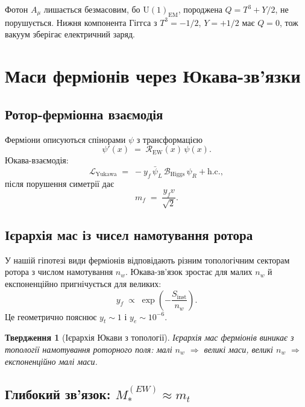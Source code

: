 \documentclass[11pt,a4paper]{article}
\newcommand{\Rotor}{\mathcal{R}}
\newcommand{\Biv}{\mathcal{B}}
\newcommand{\UU}{\mathrm{U}}
\newcommand{\Lag}{\mathcal{L}}
\theoremstyle{definition}
\theoremstyle{plain}
\newtheorem{proposition}{Твердження}
\theoremstyle{remark}
\begin{document}
Фотон $A_\mu$ лишається безмасовим, бо $\UU(1)_{\text{EM}}$, породжена $Q=T^3+Y/2$, не порушується. Нижня компонента Гіггса з $T^3=-1/2$, $Y=+1/2$ має $Q=0$, тож вакуум зберігає електричний заряд.

\vspace{1em}

\section{Маси ферміонів через Юкава-зв’язки}\label{sec:fermion-masses}

\subsection{Ротор-ферміонна взаємодія}

Ферміони описуються спінорами $\psi$ з трансформацією
\begin{equation}
  \psi'(x) \;=\; \Rotor_{\text{EW}}(x)\,\psi(x).
\end{equation}
Юкава-взаємодія:
\begin{equation}
  \Lag_{\text{Yukawa}} \;=\; -y_f\, \bar{\psi}_L\, \Biv_{\text{Higgs}}\, \psi_R + \text{h.c.},
\end{equation}
після порушення симетрії дає
\begin{equation}
  \boxed{m_f \;=\; \frac{y_f v}{\sqrt{2}}.}
\end{equation}

\subsection{Ієрархія мас із чисел намотування ротора}

У нашій гіпотезі види ферміонів відповідають різним топологічним секторам ротора з числом намотування $n_w$. Юкава-зв’язок зростає для малих $n_w$ й експоненційно пригнічується для великих:
\begin{equation}
  y_f \;\propto\; \exp\!\left(-\frac{S_{\text{inst}}}{n_w}\right).
\end{equation}
Це геометрично пояснює $y_t\sim 1$ і $y_e\sim 10^{-6}$.

\begin{proposition}[Ієрархія Юкави з топології]
Ієрархія мас ферміонів виникає з топології намотування роторного поля: малі $n_w$ $\Rightarrow$ великі маси, великі $n_w$ $\Rightarrow$ експоненційно малі маси.
\end{proposition}

\subsection{Глибокий зв'язок: $M_*^{(EW)} \approx m_t$}
\end{document}
